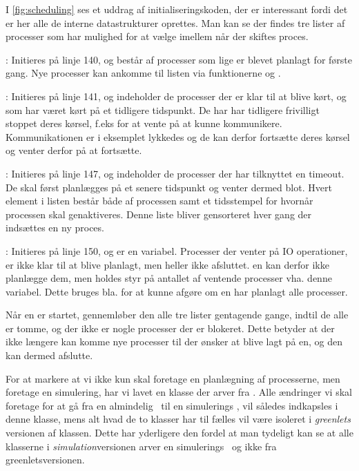  I \cref{fig:scheduling} ses et uddrag af initialiseringskoden, der er interessant fordi det er her alle de interne datastrukturer oprettes. Man kan se der findes tre lister af processer som \sched har mulighed for at vælge imellem når der skiftes proces.  
 \begin{list}
 \tightlist 
 \item {}: Initieres på linje 140, og består af processer som lige er blevet planlagt for første gang. Nye processer kan ankomme til listen  via funktionerne  og .
 \item {}: Initieres på linje 141, og indeholder de processer der er klar til at blive kørt, og som har været kørt på et tidligere tidspunkt. De har har tidligere  frivilligt stoppet deres kørsel, f.eks for at vente på at kunne kommunikere. Kommunikationen er i eksemplet lykkedes og de kan derfor fortsætte deres kørsel og venter derfor på at fortsætte.  
 \item {}: Initieres på linje 147, og indeholder de processer der har tilknyttet en timeout. De skal først planlægges på et senere tidspunkt og venter dermed blot. Hvert element i listen består både af processen samt et tidsstempel for hvornår processen skal genaktiveres. Denne liste bliver gensorteret hver gang der indsættes en ny proces.
 \item {}: Initieres på linje 150, og er en variabel. Processer der venter på IO operationer, er ikke klar til at blive planlagt, men heller ikke afsluttet. \sched en kan derfor ikke planlægge dem, men holdes styr på antallet af ventende processer vha. denne variabel. Dette bruges bla. for at kunne afgøre om \sched en har planlagt alle processer.
\end{list}

Når \sched en er startet, gennemløber den alle tre lister gentagende gange, indtil de alle er tomme, og der ikke er nogle processer der er blokeret. Dette betyder at der ikke længere kan komme nye processer til der ønsker at blive lagt på \sched en, og den kan dermed afslutte.

For at markere at vi ikke kun skal foretage en planlægning
af processerne, men foretage en simulering, har vi lavet en
 klasse der arver fra . Alle ændringer
vi skal foretage for at gå fra en almindelig \sched ~til en simulerings
\sched, vil således indkapsles i denne klasse, mens alt hvad de to
klasser har til fælles vil være isoleret i \emph{greenlets} versionen af
 klassen. Dette har yderligere den fordel at man tydeligt kan se
at alle klasserne i \emph{simulation}versionen arver en simulerings \sched ~og
ikke  fra greenletsversionen.

